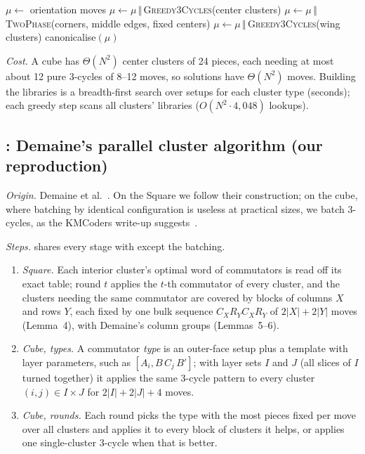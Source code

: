 \begin{algorithm}[t]
\caption{\Mtwo: reduction (our reproduction), cube}
\label{alg:m2}
\small
{}
$\mu\leftarrow$ orientation moves\;
$\mu\leftarrow\mu\,\Vert\,$\textsc{Greedy3Cycles}(center clusters)\;
$\mu\leftarrow\mu\,\Vert\,$\textsc{TwoPhase}(corners, middle edges, fixed centers)\;
$\mu\leftarrow\mu\,\Vert\,$\textsc{Greedy3Cycles}(wing clusters)\;
\Return canonicalise$(\mu)$\;
\end{algorithm}

\emph{Cost.} A cube has $\Theta(N^2)$ center clusters of 24 pieces, each needing at most about 12 pure 3-cycles of 8--12
moves, so solutions have $\Theta(N^2)$ moves. Building the libraries is a breadth-first search over setups for each
cluster type (seconds); each greedy step scans all clusters' libraries ($O(N^2\cdot 4{,}048)$ lookups).

\subsection{\Mthree: Demaine's parallel cluster algorithm (our reproduction)}
\label{sec:m3}

\emph{Origin.} Demaine et al.~\cite{demaine2011algorithms}. On the Square we follow their construction; on the cube,
where batching by identical configuration is useless at practical sizes, we batch 3-cycles, as the KMCoders write-up
suggests~\cite{kmcoders2024santa}.

\emph{Steps.} \Mthree shares every stage with \Mtwo except the batching.
\begin{enumerate}
\item \emph{Square.} Each interior cluster's optimal word of commutators is read off its exact table; round $t$ applies
  the $t$-th commutator of every cluster, and the clusters needing the same commutator are covered by blocks of columns
  $X$ and rows $Y$, each fixed by one bulk sequence $C_X R_Y C_X R_Y$ of $2|X|+2|Y|$ moves (Lemma~4), with Demaine's column
  groups (Lemmas~5--6).
\item \emph{Cube, types.} A commutator \emph{type} is an outer-face setup plus a template with layer parameters, such as
  $[A_i, B\,C_j\,B']$; with layer sets $I$ and $J$ (all slices of $I$ turned together) it applies the same 3-cycle
  pattern to every cluster $(i,j)\in I\times J$ for $2|I|+2|J|+4$ moves.
\item \emph{Cube, rounds.} Each round picks the type with the most pieces fixed per move over all clusters and applies it
  to every block of clusters it helps, or applies one single-cluster 3-cycle when that is better.
\end{enumerate}

